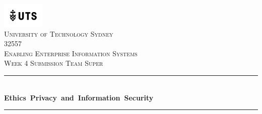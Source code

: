 \documentclass[12pt,a4paper]{article}
\begin{document}

\begin{titlepage} %

	\newcommand{\HRule}{\rule{\linewidth}{0.5mm}} %
	
	\center %
	


\vspace*{1\baselineskip}

\includegraphics[width=0.15\textwidth]{images/UTS.png}\\

 
	\textsc{\LARGE University of Technology Sydney}\\[1.5cm] %
	
	\textsc{\Large 32557}\\[0.15cm]
         \textsc{\Large Enabling Enterprise Information Systems}\\[0.5cm]%
	
	\textsc{\large Week 4 Submission Team Super}\\[0.5cm] %
	
	
	\HRule\\[0.4cm]
	
         {\huge\bfseries\mbox{Ethics Privacy and Information Security}\\[0.7cm]}


	
	\HRule\\[2cm]
	
	\vspace*{2\baselineskip}


\end{titlepage}
\end{document}
